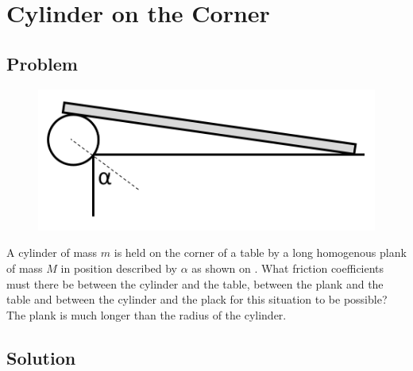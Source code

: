 \section*{Cylinder on the Corner}

\subsection*{Problem}

\begin{figure}
    \centering
    \vspace{-.75cm}
    \includegraphics[width = \textwidth / 2]{P-1}
    \caption{}
    \vspace{-1cm}
\end{figure}

A cylinder of mass $m$ is held on the corner of a table
by a long homogenous plank of mass $M$
in position described by $\alpha$
as shown on .
What friction coefficients must there be
between the cylinder and the table,
between the plank and the table and
between the cylinder and the plack
for this situation to be possible?
The plank is much longer than the radius of the cylinder.

\subsection*{Solution}


